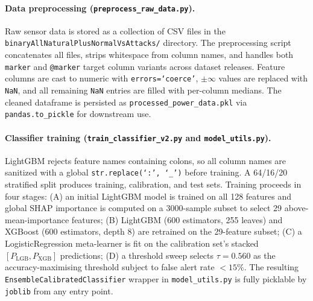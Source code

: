 \documentclass[twocolumn, 10pt, letterpaper]{article}
\begin{document}
\paragraph{Data preprocessing (\texttt{preprocess\_raw\_data.py}).}
Raw sensor data is stored as a collection of CSV files in the
\texttt{binaryAllNaturalPlusNormalVsAttacks/} directory.
The preprocessing script concatenates all files, strips whitespace from column
names, and handles both \texttt{marker} and \texttt{@marker} target column
variants across dataset releases.
Feature columns are cast to numeric with \texttt{errors=`coerce'},
$\pm\infty$ values are replaced with \texttt{NaN}, and all remaining
\texttt{NaN} entries are filled with per-column medians.
The cleaned dataframe is persisted as \texttt{processed\_power\_data.pkl}
via \texttt{pandas.to\_pickle} for downstream use.

\paragraph{Classifier training (\texttt{train\_classifier\_v2.py} and
\texttt{model\_utils.py}).}
LightGBM rejects feature names containing colons, so all column names are
sanitized with a global \texttt{str.replace(`:', `\_')} before training.
A 64/16/20 stratified split produces training, calibration, and test sets.
Training proceeds in four stages:
(A) an initial LightGBM model is trained on all 128 features and global SHAP
importance is computed on a 3000-sample subset to select 29 above-mean-importance
features;
(B) LightGBM (600 estimators, 255 leaves) and XGBoost (600 estimators, depth 8)
are retrained on the 29-feature subset;
(C) a LogisticRegression meta-learner is fit on the calibration set's stacked
$[P_\text{LGB}, P_\text{XGB}]$ predictions;
(D) a threshold sweep selects $\tau = 0.560$ as the accuracy-maximising threshold
subject to false alert rate $< 15\%$.
The resulting \texttt{EnsembleCalibratedClassifier} wrapper in \texttt{model\_utils.py}
is fully picklable by \texttt{joblib} from any entry point.
\end{document}
